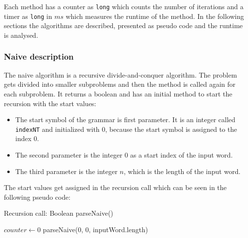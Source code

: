 \documentclass[a4paper, 11pt]{article}
\begin{document}
Each method has a counter as \texttt{long} which counts the number of iterations and a timer as \texttt{long} in $ms$ which measures the runtime of the method. In the following sections the algorithms are described, presented as pseudo code and the runtime is analysed.


\subsubsection{Naive description}
\label{naivedescription}


The naive algorithm is a recursive divide-and-conquer algorithm. The problem gets divided into smaller subproblems and then the method is called again for each subproblem. It returns a boolean and has an initial method to start the recursion with the start values:
\begin{itemize}
\item The start symbol of the grammar is first parameter. It is an integer called \texttt{indexNT} and initialized with 0, because the start symbol is assigned to the index 0.
\item The second parameter is the integer 0 as a start index of the input word.
\item The third parameter is the integer $n$, which is the length of the input word.
\end{itemize} 


The start values get assigned in the recursion call which can be seen in the following pseudo code:
 
\begin{algorithm}[H]
\label{alg_naive_rec_call}
\caption{Recursion call: Boolean parseNaive()}\label{alg:cap}
\begin{algorithmic}[1]
\State $counter \gets 0$
\State \Return parseNaive(0, 0, inputWord.length)
\end{algorithmic}
\end{algorithm}
\end{document}
